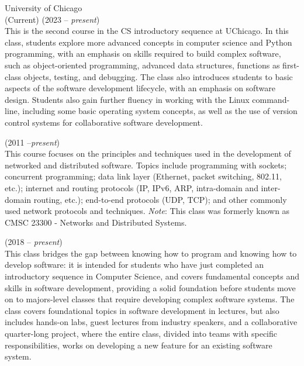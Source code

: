 \documentclass{resume}
\begin{document}
\begin{category}{University of Chicago\\(Current)} 
 (2023 -- \emph{present})\\
This is the second course in the CS introductory sequence at UChicago. In this class, students explore more advanced concepts in computer science and Python programming, with an emphasis on skills required to build complex software, such as object-oriented programming, advanced data structures, functions as first-class objects, testing, and debugging. The class also introduces students to basic aspects of the software development lifecycle, with an emphasis on software design. Students also gain further fluency in working with the Linux command-line, including some basic operating system concepts, as well as the use of version control systems for collaborative software development.

 (2011 --\emph{present})\\
This course focuses on the principles and techniques used in the development of networked and distributed software. Topics include programming with sockets; concurrent programming; data link layer (Ethernet, packet switching, 802.11, etc.); internet and routing protocols (IP, IPv6, ARP, intra-domain and inter-domain routing, etc.); end-to-end protocols (UDP, TCP); and other commonly used network protocols and techniques. \emph{Note}: This class was formerly known as CMSC 23300 - Networks and Distributed Systems.

 (2018 -- \emph{present})\\
This class bridges the gap between knowing how to program and knowing how to develop software: it is intended for students who have just completed an introductory sequence in Computer Science, and covers fundamental concepts and skills in software development, providing a solid foundation before students move on to majors-level classes that require developing complex software systems. The class covers foundational topics in software development in lectures, but also includes hands-on labs, guest lectures from industry speakers, and a collaborative quarter-long project, where the entire class, divided into teams with specific responsibilities, works on developing a new feature for an existing software system.
\end{category}
\end{document}
